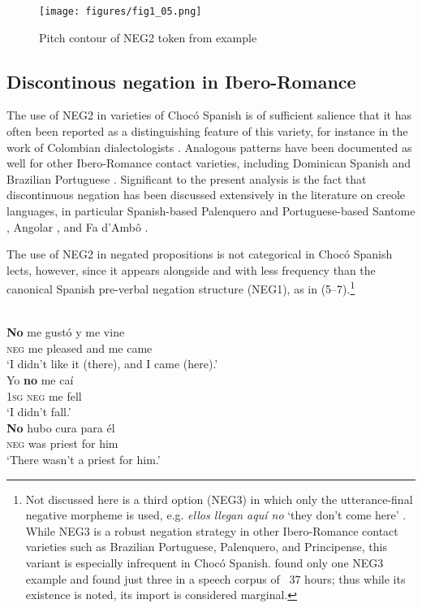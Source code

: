 \documentclass[output=paper,colorlinks,citecolor=brown]{langscibook}
\begin{document}
\begin{figure}
    \texttt{[image: figures/fig1\_05.png]} %
    \caption{Pitch contour of NEG2 token from example }
    \label{fig:fig1_05}
\end{figure}

\subsection{Discontinous negation in Ibero-Romance}

The use of NEG2 in varieties of Chocó Spanish is of sufficient salience that it has often been reported as a distinguishing feature of this variety, for instance in the work of Colombian dialectologists \citep{Florez_1950,Granda_1988,MontesGiraldo_1974}. Analogous patterns have been documented as well for other Ibero-Romance contact varieties, including Dominican Spanish \citep{Megenney_1990,OrtizLopez_2007,Schwegler_1991b} and Brazilian Portuguese \citep{Schwegler_1991c,Schwenter_2005}. Significant to the present analysis is the fact that discontinuous negation has been discussed extensively in the literature on creole languages, in particular Spanish-based Palenquero \citep{Dieck_2000,Schwegler_1991d,Schwegler_2016,Schwegler_2018} and Portuguese-based Santome \citep{Ferraz_1979,Guldemann_Hagemeijer_2019,Hagemeijer_2008,Hagemeijer_2009}, Angolar \citep{Maurer_1995}, and Fa d’Ambô \citep{Post_2013}.

The use of NEG2 in negated propositions is not categorical in Chocó Spanish lects, however, since it appears alongside and with less frequency than the canonical Spanish pre-verbal negation structure (NEG1), as in (5--7).\footnote{Not discussed here is a third option (NEG3) in which only the utterance-final negative morpheme is used, e.g. \emph{ellos llegan aquí no} ‘they don’t come here’ \citep[102]{RuizGarcia_2001}. While NEG3 is a robust negation strategy in other Ibero-Romance contact varieties such as Brazilian Portuguese, Palenquero, and Principense, this variant is especially infrequent in Chocó Spanish. \citet{Schwegler_1991a} found only one NEG3 example and \citet{RuizGarcia_2001} found just three  in a speech corpus of ~37 hours; thus while its existence is noted, its import is considered marginal.}

\ea\label{ex:5:5}\citep[96]{Schwegler_1991a}\\
\gll \textbf{No} me gustó y me vine\\
     \textsc{neg} me pleased and me came  \\
\glt ‘I   didn’t like it (there), and I came (here).’
\ex \citep[107]{Schwegler_1991a}\\
\gll Yo \textbf{no} me caí \\
     \textsc{1sg} \textsc{neg} me fell \\
\glt ‘I didn’t fall.’
\ex \citep[111]{Schwegler_1991a}\\
\gll \textbf{No} hubo cura para él  \\
     \textsc{neg} was priest for him  \\
\glt ‘There wasn’t a priest for him.’
\z
\end{document}

